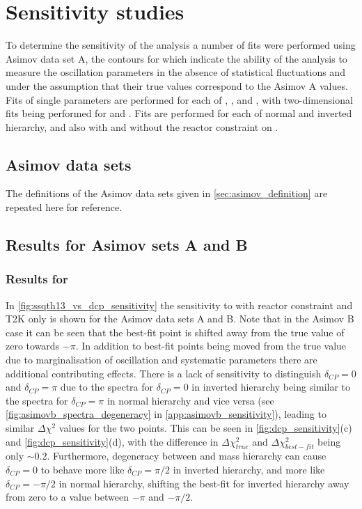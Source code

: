 \clearpage

\section {Sensitivity studies}
\label{sec:sensitivity}
To determine the sensitivity of the analysis a number of fits were performed using Asimov data set A, the contours for which indicate the ability of the analysis to measure the oscillation parameters in the absence of statistical fluctuations and under the assumption that their true values correspond to the Asimov A values. Fits of single parameters are performed for each of \ssqthonethree, \deltacp, \ssqthtwothree and \dmsqtwothree, with two-dimensional fits being performed for \appearance and \disappearance. Fits are performed for each of normal and inverted hierarchy, and also with and without the reactor constraint on \ssqthonethree.

\subsection {Asimov data sets}
\label{sec:sensitivity:asimov_data_sets}
The definitions of the Asimov data sets given in \cref{sec:asimov_definition} are repeated here for reference.

\clearpage
\subsection{Results for Asimov sets A and B}
\label{sec:sensitivity:asimov_results}

\subsubsection{Results for \appearance}
In \cref{fig:ssqth13_vs_dcp_sensitivity} the sensitivity to \appearance with reactor constraint and T2K only is shown for the Asimov data sets A and B. Note that in the Asimov B case it can be seen that the best-fit point is shifted away from the true \deltacp value of zero towards $-\pi$. In addition to best-fit points being moved from the true value due to marginalisation of oscillation and systematic parameters there are additional contributing effects. There is a lack of sensitivity to distinguish $\delta_{CP} = 0$ and $\delta_{CP} = \pi$ due to the spectra for $\delta_{CP} = 0$ in inverted hierarchy being similar to the spectra for $\delta_{CP} = \pi$ in normal hierarchy and vice versa (see \cref{fig:asimovb_spectra_degeneracy} in \cref{app:asimovb_sensitivity}), leading to similar $\Delta\chi^2$ values for the two points. This can be seen in \cref{fig:dcp_sensitivity}(c) and \cref{fig:dcp_sensitivity}(d), with the difference in $\Delta\chi^2_{true}$ and $\Delta\chi^2_{best-fit}$ being only $\sim 0.2$. Furthermore, degeneracy between \deltacp and mass hierarchy can cause $\delta_{CP} = 0$ to behave more like $\delta_{CP} = \pi/2$ in inverted hierarchy, and more like $\delta_{CP} = -\pi/2$ in normal hierarchy, shifting the best-fit for inverted hierarchy away from zero to a value between $-\pi$ and $-\pi/2$.

